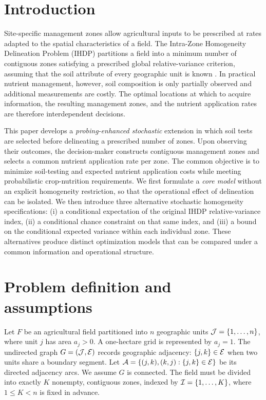 \section{Introduction}
\label{sec:introduction}

Site-specific management zones allow agricultural inputs to be prescribed
at rates adapted to the spatial characteristics of a field. The
Intra-Zone Homogeneity Delineation Problem (IHDP) partitions a field into
a minimum number of contiguous zones satisfying a prescribed global
relative-variance criterion, assuming that the soil attribute of every
geographic unit is known \citep{VicencioMedinaIHDP}. In practical nutrient
management, however, soil composition is only partially observed and
additional measurements are costly. The optimal locations at which to
acquire information, the resulting management zones, and the nutrient
application rates are therefore interdependent decisions.

This paper develops a \emph{probing-enhanced stochastic} extension in which
soil tests are selected before delineating a prescribed number of zones.
Upon observing their outcomes, the decision-maker constructs contiguous
management zones and selects a common nutrient application rate per zone.
The common objective is to minimize soil-testing and expected nutrient
application costs while meeting probabilistic crop-nutrition requirements.
We first formulate a \emph{core model} without an explicit homogeneity
restriction, so that the operational effect of delineation can be isolated.
We then introduce three alternative stochastic homogeneity specifications:
(i) a conditional expectation of the original IHDP relative-variance index,
(ii) a conditional chance constraint on that same index, and (iii) a bound
on the conditional expected variance within each individual zone. These
alternatives produce distinct optimization models that can be compared
under a common information and operational structure.

\section{Problem definition and assumptions}
\label{sec:problem}

Let $F$ be an agricultural field partitioned into $n$ geographic units
$\mathcal{J}=\{1,\ldots,n\}$, where unit $j$ has area $a_j>0$. A one-hectare grid
is represented by $a_j=1$. The undirected graph $G=(\mathcal{J},\mathcal{E})$ records
geographic adjacency: $\{j,k\}\in\mathcal{E}$ when two units share a boundary
segment. Let $\mathcal{A}=\{(j,k),(k,j):\{j,k\}\in\mathcal{E}\}$ be its directed
adjacency arcs. We assume $G$ is connected. The field must be divided
into exactly $K$ nonempty, contiguous zones, indexed by
$\mathcal{I}=\{1,\ldots,K\}$, where $1\le K<n$ is fixed in advance.


